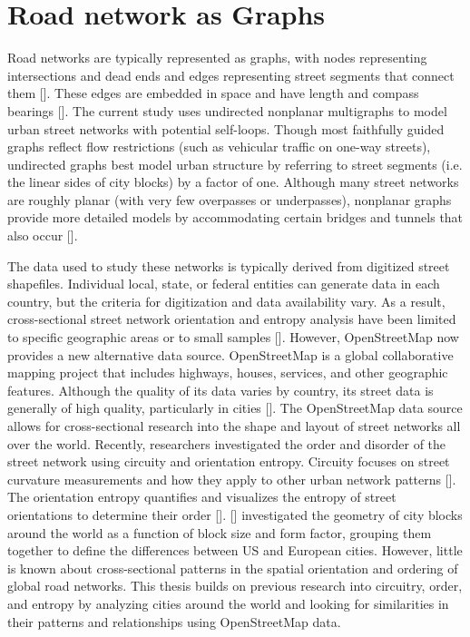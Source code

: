 \section{Road network as Graphs}
Road networks are typically represented as graphs, with nodes representing intersections and dead ends and edges representing street segments that connect them [\cite{Barthelemy:2008, Cardillo:2006, Lin:2013, Marshall:2018, Porta:2006}]. These edges are embedded in space and have length and compass bearings [\cite{Barthelemy:2011}]. The current study uses undirected nonplanar multigraphs to model urban street networks with potential self-loops. Though most faithfully guided graphs reflect flow restrictions (such as vehicular traffic on one-way streets), undirected graphs best model urban structure by referring to street segments (i.e. the linear sides of city blocks) by a factor of one. Although many street networks are roughly planar (with very few overpasses or underpasses), nonplanar graphs provide more detailed models by accommodating certain bridges and tunnels that also occur [\cite{Boeing:2018, Eppstein:2008}].

The data used to study these networks is typically derived from digitized street shapefiles. Individual local, state, or federal entities can generate data in each country, but the criteria for digitization and data availability vary. As a result, cross-sectional street network orientation and entropy analysis have been limited to specific geographic areas or to small samples [\cite{Boeing:2019}]. However, OpenStreetMap now provides a new alternative data source. OpenStreetMap is a global collaborative mapping project that includes highways, houses, services, and other geographic features. Although the quality of its data varies by country, its street data is generally of high quality, particularly in cities [\cite{Barrington-Leigh:2017, Barron:2014, Zielstra:2013}]. The OpenStreetMap data source allows for cross-sectional research into the shape and layout of street networks all over the world. Recently, researchers investigated the order and disorder of the street network using circuity and orientation entropy. Circuity focuses on street curvature measurements and how they apply to other urban network patterns [\cite{Boeing:2019, Giacomin:2015, Levinson:2009}]. The orientation entropy quantifies and visualizes the entropy of street orientations to determine their order [\cite{Courtat:2011, Gudmundsson:2013, Mohajeri:2013, Mohajeri:2013:1, Mohajeri:2014, Mohajeri:2012}]. [\cite{Louf:2014}] investigated the geometry of city blocks around the world as a function of block size and form factor, grouping them together to define the differences between US and European cities. However, little is known about cross-sectional patterns in the spatial orientation and ordering of global road networks. This thesis builds on previous research into circuitry, order, and entropy by analyzing cities around the world and looking for similarities in their patterns and relationships using OpenStreetMap data.

